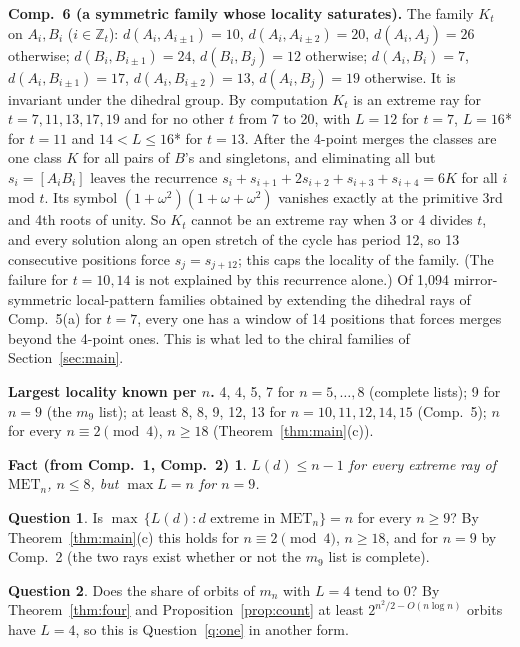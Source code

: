 \documentclass[11pt,a4paper]{article}
\newtheorem*{fact}{Fact (from Comp.~1, Comp.~2)}
\theoremstyle{definition}
\newtheorem{question}{Question}
\theoremstyle{remark}
\newcommand{\MET}{\mathrm{MET}}
\newcommand{\Z}{\mathbb{Z}}
\newcommand{\comp}[1]{\medskip\noindent\textbf{#1}}
\begin{document}
\comp{Comp.~6 (a symmetric family whose locality saturates).} The family $K_t$ on $A_i, B_i$ ($i \in \Z_t$):
$d(A_i, A_{i\pm1}) = 10$, $d(A_i, A_{i\pm2}) = 20$, $d(A_i, A_j) = 26$ otherwise; $d(B_i, B_{i\pm1}) = 24$,
$d(B_i, B_j) = 12$ otherwise; $d(A_i, B_i) = 7$, $d(A_i, B_{i\pm1}) = 17$, $d(A_i, B_{i\pm2}) = 13$,
$d(A_i, B_j) = 19$ otherwise. It is invariant under the dihedral group. By computation $K_t$ is an extreme ray for
$t = 7, 11, 13, 17, 19$ and for no other $t$ from 7 to 20, with $L = 12$ for $t = 7$, $L = 16$* for $t = 11$ and
$14 < L \le 16$* for $t = 13$. After the 4-point merges the classes are one class $K$ for all pairs of $B$'s and
singletons, and eliminating all but $s_i = [A_iB_i]$ leaves the recurrence
$s_i + s_{i+1} + 2s_{i+2} + s_{i+3} + s_{i+4} = 6K$ for all $i$ mod $t$. Its symbol
$(1 + \omega^2)(1 + \omega + \omega^2)$ vanishes exactly at the primitive 3rd and 4th roots of unity. So $K_t$
cannot be an extreme ray when 3 or 4 divides $t$, and every solution along an open stretch of the cycle has period
12, so 13 consecutive positions force $s_j = s_{j+12}$; this caps the locality of the family. (The failure for
$t = 10, 14$ is not explained by this recurrence alone.) Of 1,094 mirror-symmetric local-pattern families obtained
by extending the dihedral rays of Comp.~5(a) for $t = 7$, every one has a window of 14 positions that forces merges
beyond the 4-point ones. This is what led to the chiral families of Section~\ref{sec:main}.

\comp{Largest locality known per $n$.} 4, 4, 5, 7 for $n = 5, \dots, 8$ (complete lists); 9 for $n = 9$ (the $m_9$
list); at least 8, 8, 9, 12, 13 for $n = 10, 11, 12, 14, 15$ (Comp.~5); $n$ for every $n \equiv 2 \pmod 4$, $n \ge 18$
(Theorem~\ref{thm:main}(c)).

\begin{fact}
$L(d) \le n - 1$ for every extreme ray of $\MET_n$, $n \le 8$, but $\max L = n$ for $n = 9$.
\end{fact}

\begin{question}
Is $\max\,\{ L(d) : d \text{ extreme in } \MET_n \} = n$ for every $n \ge 9$? By Theorem~\ref{thm:main}(c) this
holds for $n \equiv 2 \pmod 4$, $n \ge 18$, and for $n = 9$ by Comp.~2 (the two rays exist whether or not the $m_9$ list
is complete).
\end{question}

\begin{question}
Does the share of orbits of $m_n$ with $L = 4$ tend to $0$? By Theorem~\ref{thm:four} and
Proposition~\ref{prop:count} at least $2^{n^2/2 - O(n \log n)}$ orbits have $L = 4$, so this is
Question~\ref{q:one} in another form.
\end{question}
\end{document}

